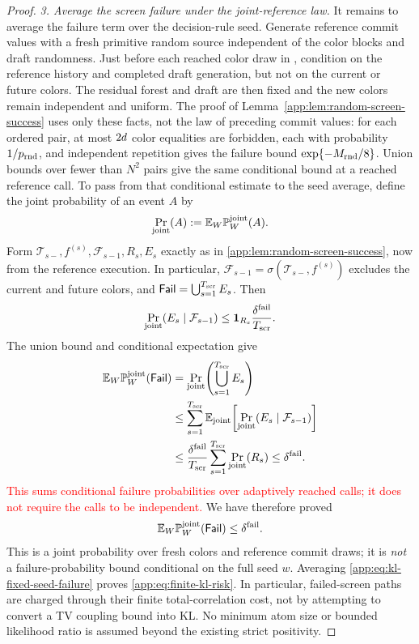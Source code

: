 \begin{proof}
\emph{3. Average the screen failure under the joint-reference law.}
It remains to average the failure term over the decision-rule seed.  Generate
reference commit values with a fresh primitive random source independent of
the color blocks and draft randomness.  Just before each reached color
draw in , condition on the reference history and
completed draft generation,
but not on the current or future colors.  The residual forest and draft are
then fixed and the new colors remain independent and uniform.  The proof of
Lemma~\ref{app:lem:random-screen-success} uses only these facts, not the law
of preceding commit values: for each ordered pair, at most $2d$
color equalities are forbidden, each with probability
$1/p_{\mathrm{rnd}}$, and independent repetition gives the failure bound
$\exp\{-M_{\mathrm{rnd}}/8\}$.  Union bounds over fewer than $N^2$
pairs give the same conditional bound at a reached reference call.
To pass from that conditional estimate to the seed average, define the
joint probability of an event $A$ by
\[
 \Pr_{\mathrm{joint}}(A):=
       \mathbb E_W\mathbb P_{W}^{\mathrm{joint}}(A).
\]
Form $\mathcal T_{s-},f^{(s)},\mathcal F_{s-1},R_s,E_s$ exactly as in
\cref{app:lem:random-screen-success}, now from the reference execution.
In particular, $\mathcal F_{s-1}=\sigma(\mathcal T_{s-},f^{(s)})$
excludes the current and future colors, and
$\mathsf{Fail}=\bigcup_{s=1}^{T_{\mathrm{scr}}}E_s$.  Then
\[
 \Pr_{\mathrm{joint}}(E_s\mid\mathcal F_{s-1})
 \le\mathbf 1_{R_s}\frac{\delta^{\mathrm{fail}}}{T_{\mathrm{scr}}}.
\]
The union bound and conditional expectation give
\begin{align*}
 \mathbb E_W\mathbb P_{W}^{\mathrm{joint}}(\mathsf{Fail})
 &=\Pr_{\mathrm{joint}}\!\left(
       \bigcup_{s=1}^{T_{\mathrm{scr}}}E_s\right)\\
 &\le\sum_{s=1}^{T_{\mathrm{scr}}}
       \mathbb E_{\mathrm{joint}}\!
        \left[\Pr_{\mathrm{joint}}(E_s\mid\mathcal F_{s-1})\right]\\
 &\le\frac{\delta^{\mathrm{fail}}}{T_{\mathrm{scr}}}
       \sum_{s=1}^{T_{\mathrm{scr}}}\Pr_{\mathrm{joint}}(R_s)
 \le\delta^{\mathrm{fail}}.
\end{align*}
\textcolor{red}{This sums conditional failure probabilities over adaptively
reached calls; it does not require the calls to be independent.}
We have therefore proved
\begin{equation}
 \mathbb E_{W}
   \mathbb P_{W}^{\mathrm{joint}}(\mathsf{Fail})
 \le\delta^{\mathrm{fail}}.
 \label{app:eq:joint-reference-screen-failure}
\end{equation}
This is a joint probability over fresh colors and reference commit draws;
it is \emph{not} a failure-probability bound conditional on the full seed
$w$.  Averaging \eqref{app:eq:kl-fixed-seed-failure} proves
\eqref{app:eq:finite-kl-risk}.  In particular, failed-screen paths are charged
through their finite total-correlation cost, not by attempting to convert a
TV coupling bound into KL.  No minimum atom size or bounded likelihood ratio
is assumed beyond the existing strict positivity.
\end{proof}


